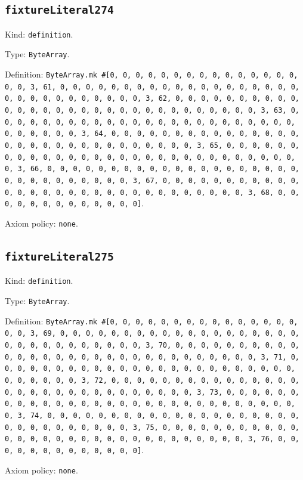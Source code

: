 \documentclass[11pt]{article}
\begin{document}
\subsection*{\texttt{fixtureLiteral274}}
\noindent Kind: \texttt{definition}.\par
\noindent Type: \texttt{ByteArray}.\par
\noindent Definition: \texttt{ByteArray.mk \#[0, 0, 0, 0, 0, 0, 0, 0, 0, 0, 0, 0, 0, 0, 0, 0, 0, 3, 61, 0, 0, 0, 0, 0, 0, 0, 0, 0, 0, 0, 0, 0, 0, 0, 0, 0, 0, 0, 0, 0, 0, 0, 0, 0, 0, 0, 0, 0, 0, 3, 62, 0, 0, 0, 0, 0, 0, 0, 0, 0, 0, 0, 0, 0, 0, 0, 0, 0, 0, 0, 0, 0, 0, 0, 0, 0, 0, 0, 0, 0, 0, 3, 63, 0, 0, 0, 0, 0, 0, 0, 0, 0, 0, 0, 0, 0, 0, 0, 0, 0, 0, 0, 0, 0, 0, 0, 0, 0, 0, 0, 0, 0, 0, 3, 64, 0, 0, 0, 0, 0, 0, 0, 0, 0, 0, 0, 0, 0, 0, 0, 0, 0, 0, 0, 0, 0, 0, 0, 0, 0, 0, 0, 0, 0, 0, 3, 65, 0, 0, 0, 0, 0, 0, 0, 0, 0, 0, 0, 0, 0, 0, 0, 0, 0, 0, 0, 0, 0, 0, 0, 0, 0, 0, 0, 0, 0, 0, 3, 66, 0, 0, 0, 0, 0, 0, 0, 0, 0, 0, 0, 0, 0, 0, 0, 0, 0, 0, 0, 0, 0, 0, 0, 0, 0, 0, 0, 0, 0, 0, 3, 67, 0, 0, 0, 0, 0, 0, 0, 0, 0, 0, 0, 0, 0, 0, 0, 0, 0, 0, 0, 0, 0, 0, 0, 0, 0, 0, 0, 0, 0, 0, 3, 68, 0, 0, 0, 0, 0, 0, 0, 0, 0, 0, 0, 0, 0]}.\par
\noindent Axiom policy: \texttt{none}.\par
\subsection*{\texttt{fixtureLiteral275}}
\noindent Kind: \texttt{definition}.\par
\noindent Type: \texttt{ByteArray}.\par
\noindent Definition: \texttt{ByteArray.mk \#[0, 0, 0, 0, 0, 0, 0, 0, 0, 0, 0, 0, 0, 0, 0, 0, 0, 3, 69, 0, 0, 0, 0, 0, 0, 0, 0, 0, 0, 0, 0, 0, 0, 0, 0, 0, 0, 0, 0, 0, 0, 0, 0, 0, 0, 0, 0, 0, 0, 3, 70, 0, 0, 0, 0, 0, 0, 0, 0, 0, 0, 0, 0, 0, 0, 0, 0, 0, 0, 0, 0, 0, 0, 0, 0, 0, 0, 0, 0, 0, 0, 3, 71, 0, 0, 0, 0, 0, 0, 0, 0, 0, 0, 0, 0, 0, 0, 0, 0, 0, 0, 0, 0, 0, 0, 0, 0, 0, 0, 0, 0, 0, 0, 3, 72, 0, 0, 0, 0, 0, 0, 0, 0, 0, 0, 0, 0, 0, 0, 0, 0, 0, 0, 0, 0, 0, 0, 0, 0, 0, 0, 0, 0, 0, 0, 3, 73, 0, 0, 0, 0, 0, 0, 0, 0, 0, 0, 0, 0, 0, 0, 0, 0, 0, 0, 0, 0, 0, 0, 0, 0, 0, 0, 0, 0, 0, 0, 3, 74, 0, 0, 0, 0, 0, 0, 0, 0, 0, 0, 0, 0, 0, 0, 0, 0, 0, 0, 0, 0, 0, 0, 0, 0, 0, 0, 0, 0, 0, 0, 3, 75, 0, 0, 0, 0, 0, 0, 0, 0, 0, 0, 0, 0, 0, 0, 0, 0, 0, 0, 0, 0, 0, 0, 0, 0, 0, 0, 0, 0, 0, 0, 3, 76, 0, 0, 0, 0, 0, 0, 0, 0, 0, 0, 0, 0, 0]}.\par
\noindent Axiom policy: \texttt{none}.\par
\end{document}
